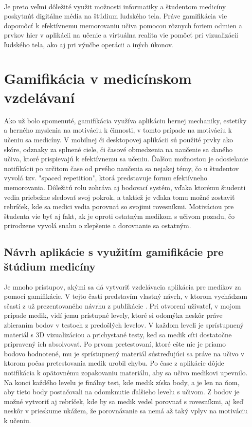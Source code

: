 \documentclass[10pt,twoside,slovak,a4paper]{article}
\begin{document}
\paragraph{}
Je preto veľmi dôležité využit možnosti informatiky a študentom medicíny poskytnúť digitálne média na štúdium ľudského tela. Práve gamifikácia vie dopomôcť k efektívnemu memorovaniu učiva pomocou rôznych foriem odmien a prvkov hier v aplikácii na učenie a virtuálna realita vie pomôcť pri vizualizácii ľudského tela, ako aj pri výučbe operácii a iných úkonov.



\section{Gamifikácia v medicínskom vzdelávaní} \label{druhacast}
Ako už bolo spomenuté, gamifikácia využíva aplikáciu hernej mechaniky, estetiky a herného myslenia na motiváciu k činnosti, v tomto prípade na motiváciu k učeniu sa medicíny. V mobilnej či desktopovej aplikácii sú použité prvky ako skóre, odznaky za splnené ciele, či časové obmedzenia na naučenie sa daného učiva, ktoré prispievajú k efektívnemu sa učeniu. \cite{RojasGamification} Ďalšou možnostou je odosielanie notifikácii po určitom čase od prvého naučenia sa nejakej témy, čo u študentov vyvolá tzv. "spaced repetition", ktorá predstavuje formu efektívneho memorovania. Dôležitú rolu zohráva aj bodovací systém, vďaka ktorému študenti vedia priebežne sledovať svoj pokrok, a taktiež je vďaka tomu možné zostaviť rebríček, kde sa medici vedia porovnať so svojimi rovesníkmi. Motiváciou pre študenta vie byť aj fakt, ak je oproti ostatným medikom s učivom pozadu, čo prirodzene vyvolá snahu o zlepšenie a dorovnanie sa ostatným. \cite{RojasGamification}

\subsection{Návrh aplikácie s využitím gamifikácie pre štúdium medicíny} \label{druhacast:aplikacia} 
Je mnoho prístupov, akými sa dá vytvoriť vzdelávacia aplikácia pre medikov za pomoci gamifikácie. V tejto časti predstavím vlastný návrh, v ktorom vychádzam sčasti z už prezentovaného návrhu z publikácie \cite{9611852}. Pri otvorení uživateľ, v mojom prípade medik, vidí jemu prístupné levely, ktoré si odomýka neskôr práve zbieraním bodov v testoch z predošlých levelov. V každom leveli je sprístupnený materiál s 3D vizualizáciou a prichystané testy, keď sa medik cíti dostatočne pripravený ich absolvovať. Po prvom pretestovaní, ktoré ešte nie je priamo bodovo hodnotené, mu je sprístupnený materiál sústreďujúci sa práve na učivo v ktorom počas pretestovania medik urobil chybu. Po čase z aplikácie dôjde notifikácia k opätovnému zopakovaniu materiálu, aby sa učivo medikovi upevnilo. Na konci každého levelu je finálny test, kde medik získa body, a je len na ňom, aby tieto body postačovali na odomknutie ďalšieho levelu s učivom. Z bodov je možné vytvoriť aj rebríček, kde by sa medik vedel porovnať s rovesníkmi, aj keď neskôr v prieskume ukážem, že porovnávanie sa nemá až taký vplyv na motiváciu k učeniu.
\end{document}
